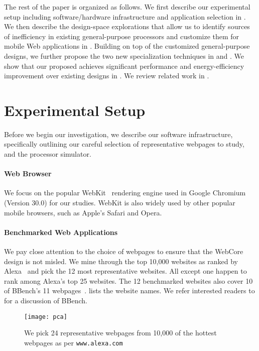 The rest of the paper is organized as follows. We first describe our experimental setup including software/hardware infrastructure and application selection in . We then describe the design-space explorations that allow us to identify sources of inefficiency in existing general-purpose processors and customize them for mobile Web applications in . Building on top of the customized general-purpose designs, we further propose the two new specialization techniques in  and . We show that our proposed \webcore achieves significant performance and energy-efficiency improvement over existing designs in . We review related work in .

\section{Experimental Setup}
\label{sec:arch:exp}

Before we begin our investigation, we describe our software infrastructure, specifically outlining our careful selection of representative webpages to study, and the processor simulator. 

\paragraph{Web Browser} We focus on the popular WebKit~\cite{webkit} rendering engine used in Google Chromium (Version 30.0) for our studies. WebKit is also widely used by other popular mobile browsers, such as Apple's Safari and Opera.

\paragraph{Benchmarked Web Applications}  We pay close attention to the choice of webpages to ensure that the WebCore design is not misled. We mine through the top 10,000 websites as ranked by Alexa~\cite{alexa} and pick the 12 most representative websites. All except one happen to rank among Alexa's top 25 websites. The 12 benchmarked websites also cover 10 of BBench's 11 webpages~\cite{BBench}.  lists the website names. We refer interested readers to  for a discussion of BBench. 

\begin{figure}[t]
  \centering
  \texttt{[image: pca]}
  \caption{We pick 24 representative webpages from 10,000 of the hottest webpages as per \texttt{www.alexa.com}}
  \label{fig:pca}
\end{figure}

